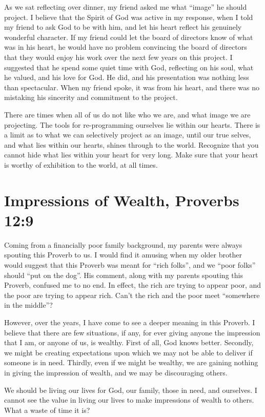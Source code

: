 \documentclass[12pt]{memoir}
\begin{document}
As we sat reflecting over dinner, my friend asked me what ``image''
he should project. I believe that the Spirit of God was active in
my response, when I told my friend to ask God to be with him, and
let his heart reflect his genuinely wonderful character. If my friend
could let the board of directors know of what was in his heart, he
would have no problem convincing the board of directors that they
would enjoy his work over the next few years on this project. I suggested
that he spend some quiet time with God, reflecting on his soul, what
he valued, and his love for God. He did, and his presentation was
nothing less than spectacular. When my friend spoke, it was from his
heart, and there was no mistaking his sincerity and commitment to
the project. 

There are times when all of us do not like who we are, and what image
we are projecting. The tools for re-programming ourselves lie within
our hearts. There is a limit as to what we can selectively project
as an image, until our true selves, and what lies within our hearts,
shines through to the world. Recognize that you cannot hide what lies
within your heart for very long. Make sure that your heart is worthy
of exhibition to the world, at all times. 

\section{Impressions of Wealth, Proverbs 12:9}

Coming from a financially poor family background, my parents were
always spouting this Proverb to us. I would find it amusing when my
older brother would suggest that this Proverb was meant for ``rich
folks'', and we ``poor folks'' should ``put on the dog''. His
comment, along with my parents spouting this Proverb, confused me
to no end. In effect, the rich are trying to appear poor, and the
poor are trying to appear rich. Can't the rich and the poor meet ``somewhere
in the middle''?

However, over the years, I have come to see a deeper meaning in this
Proverb. I believe that there are few situations, if any, for ever
giving anyone the impression that I am, or anyone of us, is wealthy.
First of all, God knows better. Secondly, we might be creating expectations
upon which we may not be able to deliver if someone is in need. Thirdly,
even if we might be wealthy, we are gaining nothing in giving the
impression of wealth, and we may be discouraging others.

We should be living our lives for God, our family, those in need,
and ourselves. I cannot see the value in living our lives to make
impressions of wealth to others. What a waste of time it is? 
\end{document}
